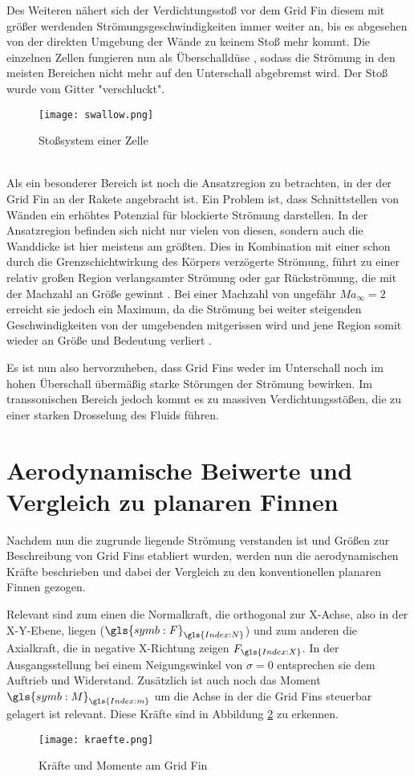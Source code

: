 Des Weiteren nähert sich der Verdichtungsstoß vor dem Grid Fin diesem mit größer werdenden Strömungsgeschwindigkeiten immer weiter an, bis es abgesehen von der direkten Umgebung der Wände zu keinem Stoß mehr kommt. Die einzelnen Zellen fungieren nun als Überschalldüse \cite{stroemung}, sodass die Strömung in den meisten Bereichen nicht mehr auf den Unterschall abgebremst wird. Der Stoß wurde vom Gitter "verschluckt".
\begin{figure}[h]
	\centering
	\texttt{[image: swallow.png]}
	\caption{Stoßsystem einer Zelle}
	\label{abb_stoesse}
\end{figure}\\
Als ein besonderer Bereich ist noch die Ansatzregion zu betrachten, in der der Grid Fin an der Rakete angebracht ist. Ein Problem ist, dass Schnittstellen von Wänden ein erhöhtes Potenzial für blockierte Strömung darstellen. In der Ansatzregion befinden sich nicht nur vielen von diesen, sondern auch die Wanddicke ist hier meistens am größten. Dies in Kombination mit einer schon durch die Grenzschichtwirkung des Körpers verzögerte Strömung, führt zu einer relativ großen Region verlangsamter Strömung oder gar Rückströmung, die mit der Machzahl an Größe gewinnt \cite{stroemung}. Bei einer Machzahl von ungefähr $Ma_\infty = 2$ erreicht sie jedoch ein Maximum, da die Strömung bei weiter steigenden Geschwindigkeiten von der umgebenden mitgerissen wird und jene Region somit wieder an Größe und Bedeutung verliert \cite{stroemung}.

Es ist nun also hervorzuheben, dass Grid Fins weder im Unterschall noch im hohen Überschall übermäßig starke Störungen der Strömung bewirken. Im transsonischen Bereich jedoch kommt es zu massiven Verdichtungsstößen, die zu einer starken Drosselung des Fluids führen.
\newpage

\section{Aerodynamische Beiwerte und Vergleich zu planaren Finnen}
Nachdem nun die zugrunde liegende Strömung verstanden ist und Größen zur Beschreibung von Grid Fins etabliert wurden, werden nun die aerodynamischen Kräfte beschrieben und dabei der Vergleich zu den konventionellen planaren Finnen gezogen.

Relevant sind zum einen die Normalkraft, die orthogonal zur X-Achse, also in der X-Y-Ebene, liegen ($\gls{symb:F}_{\gls{Index:N}}$) und zum anderen die Axialkraft, die in negative X-Richtung zeigen $F_{\gls{Index:X}}$. In der Ausgangsstellung bei einem Neigungswinkel von $\sigma = 0$ entsprechen sie dem Auftrieb und Widerstand. Zusätzlich ist auch noch das Moment $\gls{symb:M}_{\gls{Index:m}}$ um die Achse in der die Grid Fins steuerbar gelagert ist relevant. Diese Kräfte sind in Abbildung \ref{abb_kraefte} zu erkennen.
\begin{figure}[h]
	\centering
	\texttt{[image: kraefte.png]}
	\caption{Kräfte und Momente am Grid Fin}
	\label{abb_kraefte}
\end{figure}\\
